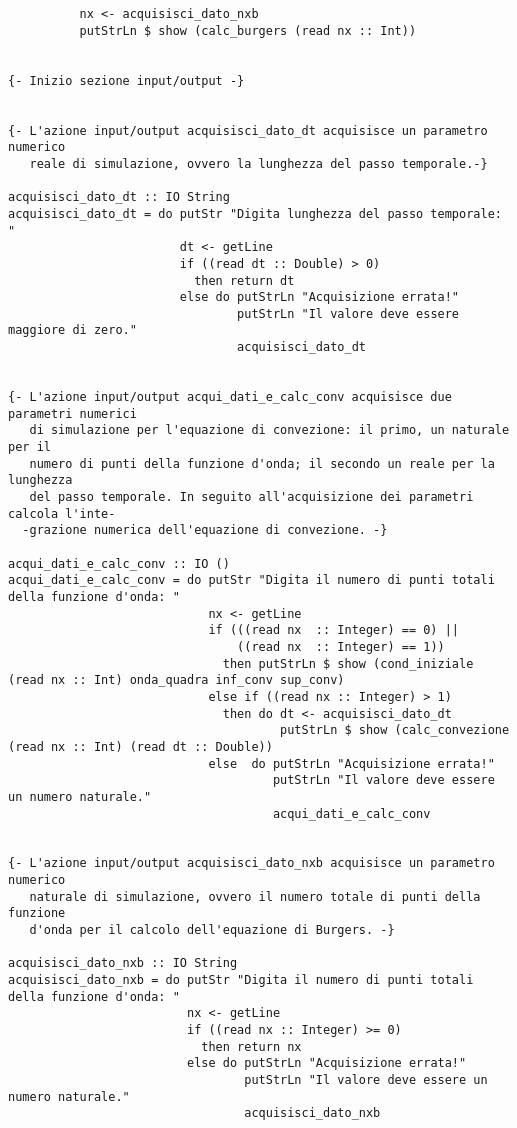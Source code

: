\begin{verbatim}
          nx <- acquisisci_dato_nxb 
          putStrLn $ show (calc_burgers (read nx :: Int))


{- Inizio sezione input/output -}


{- L'azione input/output acquisisci_dato_dt acquisisce un parametro numerico
   reale di simulazione, ovvero la lunghezza del passo temporale.-}

acquisisci_dato_dt :: IO String
acquisisci_dato_dt = do putStr "Digita lunghezza del passo temporale: "
                        dt <- getLine
                        if ((read dt :: Double) > 0)
                          then return dt
                        else do putStrLn "Acquisizione errata!"
                                putStrLn "Il valore deve essere maggiore di zero."
                                acquisisci_dato_dt 


{- L'azione input/output acqui_dati_e_calc_conv acquisisce due parametri numerici
   di simulazione per l'equazione di convezione: il primo, un naturale per il 
   numero di punti della funzione d'onda; il secondo un reale per la lunghezza
   del passo temporale. In seguito all'acquisizione dei parametri calcola l'inte- 
  -grazione numerica dell'equazione di convezione. -}

acqui_dati_e_calc_conv :: IO ()
acqui_dati_e_calc_conv = do putStr "Digita il numero di punti totali della funzione d'onda: "
                            nx <- getLine
                            if (((read nx  :: Integer) == 0) ||
                                ((read nx  :: Integer) == 1)) 
                              then putStrLn $ show (cond_iniziale (read nx :: Int) onda_quadra inf_conv sup_conv)
                            else if ((read nx :: Integer) > 1)
                              then do dt <- acquisisci_dato_dt
                                      putStrLn $ show (calc_convezione (read nx :: Int) (read dt :: Double))
                            else  do putStrLn "Acquisizione errata!"
                                     putStrLn "Il valore deve essere un numero naturale."
                                     acqui_dati_e_calc_conv


{- L'azione input/output acquisisci_dato_nxb acquisisce un parametro numerico
   naturale di simulazione, ovvero il numero totale di punti della funzione
   d'onda per il calcolo dell'equazione di Burgers. -}

acquisisci_dato_nxb :: IO String
acquisisci_dato_nxb = do putStr "Digita il numero di punti totali della funzione d'onda: "
                         nx <- getLine
                         if ((read nx :: Integer) >= 0)
                           then return nx
                         else do putStrLn "Acquisizione errata!"
                                 putStrLn "Il valore deve essere un numero naturale."
                                 acquisisci_dato_nxb 



\end{verbatim}
